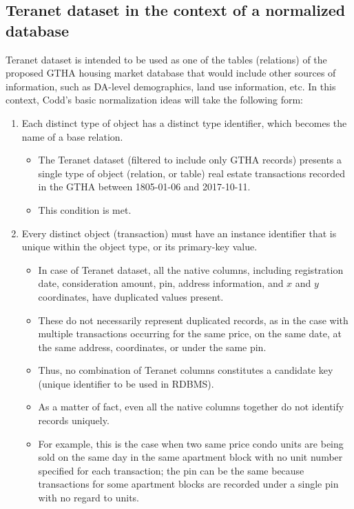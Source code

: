 \subsection{Teranet dataset in the context of a normalized database} \label{subsec:teranet_db_norm}

Teranet dataset is intended to be used as one of the tables (relations) of the proposed GTHA housing market database that would include other sources of information, such as DA-level demographics, land use information, etc.
In this context, Codd's basic normalization ideas will take the following form:

\begin{enumerate}
    \item Each distinct type of object has a distinct type identifier, which becomes the name of a base relation.
    \begin{itemize}
        \item The Teranet dataset (filtered to include only GTHA records) presents a single type of object (relation, or table) \textemdash real estate transactions recorded in the GTHA between 1805-01-06 and 2017-10-11.
        \item This condition is met.
    \end{itemize}
    \item Every distinct object (transaction) must have an instance identifier that is unique within the object type, or its primary-key value.
    \begin{itemize}
        \item In case of Teranet dataset, all the native columns, including registration date, consideration amount, pin, address information, and $x$ and $y$ coordinates, have duplicated values present.
        \item These do not necessarily represent duplicated records, as in the case with multiple transactions occurring for the same price, on the same date, at the same address, coordinates, or under the same pin.
        \item Thus, no combination of Teranet columns constitutes a candidate key (unique identifier to be used in RDBMS).
        \item As a matter of fact, even all the native columns together do not identify records uniquely.
        \item For example, this is the case when two same price condo units are being sold on the same day in the same apartment block with no unit number specified for each transaction;
        the pin can be the same because transactions for some apartment blocks are recorded under a single pin with no regard to units.

\end{itemize}
\end{enumerate}
